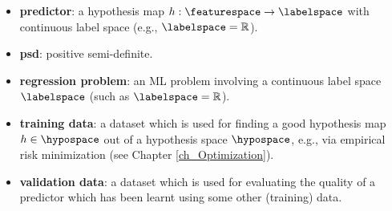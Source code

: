 \documentclass[12pt]{report}
\begin{document}
\begin{itemize}
\item {\bf predictor}: a hypothesis map $h: \featurespace \rightarrow \labelspace$ with continuous 
label space (e.g., $\labelspace = \mathbb{R}$). 

\item {\bf psd}: positive semi-definite. %

\item {\bf regression problem}: an ML problem involving a continuous label space $\labelspace$ 
(such as $\labelspace = \mathbb{R}$). 

\item {\bf training data}: a dataset which is used for finding a good hypothesis map $h \in \hypospace$ 
out of a hypothesis space $\hypospace$, e.g., via empirical risk minimization (see Chapter \ref{ch_Optimization}). 

\item {\bf validation data}: a dataset which is used for evaluating the quality of a predictor which 
has been learnt using some other (training) data. 
\end{itemize} 
                                    









%

\end{document}
